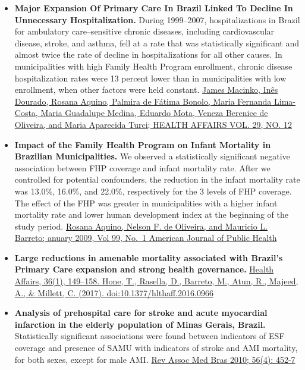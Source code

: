 \documentclass[]{book}
\begin{document}
\begin{itemize}
\item
  \textbf{Major Expansion Of Primary Care In Brazil Linked To Decline In Unnecessary Hospitalization.} During 1999--2007, hospitalizations in Brazil for ambulatory care--sensitive chronic diseases, including cardiovascular disease, stroke, and asthma, fell at a rate that was statistically significant and almost twice the rate of decline in hospitalizations for all other causes. In municipalities with high Family Health Program enrollment, chronic disease hospitalization rates were 13 percent lower than in municipalities with low enrollment, when other factors were held constant. \href{https://www.healthaffairs.org/doi/full/10.1377/hlthaff.2010.0251}{James Macinko, Inês Dourado, Rosana Aquino, Palmira de Fátima Bonolo, Maria Fernanda Lima-Costa, Maria Guadalupe Medina, Eduardo Mota, Veneza Berenice de Oliveira, and Maria Aparecida Turci; HEALTH AFFAIRS VOL. 29, NO. 12}
\item
  \textbf{Impact of the Family Health Program on Infant Mortality in Brazilian Municipalities.} We observed a statistically significant negative association between FHP coverage and infant mortality rate. After we controlled for potential confounders, the reduction in the infant mortality rate was 13.0\%, 16.0\%, and 22.0\%, respectively for the 3 levels of FHP coverage. The effect of the FHP was greater in municipalities with a higher infant mortality rate and lower human development index at the beginning of the study period. \href{https://www.ncbi.nlm.nih.gov/pmc/articles/PMC2636620/pdf/87.pdf}{Rosana Aquino, Nelson F. de Oliveira, and Mauricio L. Barreto; anuary 2009, Vol 99, No.~1 \textbar{} American Journal of Public Health}
\item
  \textbf{Large reductions in amenable mortality associated with Brazil's Primary Care expansion and strong health governance.} \href{https://www.healthaffairs.org/doi/full/10.1377/hlthaff.2016.0966?url_ver=Z39.88-2003\&rfr_id=ori:rid:crossref.org\&rfr_dat=cr_pub\%3dpubmed}{Health Affairs, 36(1), 149--158. Hone, T., Rasella, D., Barreto, M., Atun, R., Majeed, A., \& Millett, C. (2017). doi:10.1377/hlthaff.2016.0966}
\item
  \textbf{Analysis of prehospital care for stroke and acute myocardial infarction in the elderly population of Minas Gerais, Brazil.} Statistically significant associations were found between indicators of ESF coverage and presence of SAMU with indicators of stroke and AMI mortality, for both sexes, except for male AMI. \href{http://www.scielo.br/pdf/ramb/v56n4/en_19.pdf}{Rev Assoc Med Bras 2010; 56(4): 452-7}

\end{itemize}
\end{document}
